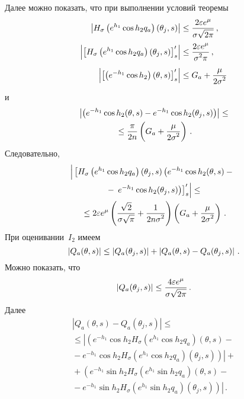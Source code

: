 \begin{multicols}{2}
Далее можно показать, что при выполнении условий теоремы
\begin{align*}
\left|H_\sigma\left ( e^{h_1}\cos{h_2}q_a\right )(\theta_j,s)\right|&
\leq\displaystyle\frac{\displaystyle 2\varepsilon e^{\mu}\mathstrut}{\displaystyle \sigma\sqrt{2\pi}\mathstrut}\,,\\
\left|\left[H_\sigma\left (e^{h_1}\cos{h_2}q_a\right )(\theta_j,s)\right]'_s\right|&
\leq\displaystyle\frac{\displaystyle 2\varepsilon e^{\mu}\mathstrut}{\displaystyle \sigma^2\pi\mathstrut}\,,\\
\left|\left[\left (e^{-h_1}\cos{h_2}\right )(\theta,s)\right]'_s\right|&
\leq G_a+\displaystyle\frac{\displaystyle \mu\mathstrut}{\displaystyle 2\sigma^2\mathstrut}
\end{align*}
и
\begin{multline*}
\left|\left(e^{-h_1}\cos{h_2}(\theta,s)-e^{-h_1}\cos{h_2}(\theta_j,s)\right)\right|\leq\\
{}\leq \displaystyle\frac{\displaystyle \pi\mathstrut}{\displaystyle 2n\mathstrut}\left(G_a+\displaystyle\frac{\displaystyle \mu\mathstrut}{\displaystyle 2\sigma^2\mathstrut}\right)\,.
\end{multline*}
Следовательно,
\begin{multline}
\left|
\vphantom{{}\left.\left.+e^{-h_1}\sin{h_2}H_\sigma(e^{h_1}\sin{h_2}q_a)(\theta,s)\right)'_s\right| \leq{}}
\left[H_\sigma\left ( e^{h_1}\cos{h_2}q_a\right )
(\theta_j,s)\left(e^{-h_1}\cos{h_2}(\theta,s)-{}\right.\right.\right.\\
\left.{}-\left.\left.e^{-h_1}\cos{h_2}(\theta_j,s)\right)\right]'_s\right| \leq{}\\
{}\leq 2\eps e^{\mu}\left(\fr{\sqrt{2}}{\sigma\sqrt{\pi}}+\fr{1}{2n\sigma^2}\right)\left(G_a+\fr{\mu}{2\sigma^2}\right)\,.
\label{e15sh}
\end{multline}
При оценивании~$I_2$ имеем
\begin{equation}
\left|Q_a(\theta,s)\right|\leq\left|Q_a(\theta_j,s)\right|+\left|Q_a(\theta,s)-Q_a(\theta_j,s)\right|\,.
\label{e16sh}
\end{equation}
Можно показать, что
\begin{equation}
\left|Q_a(\theta_j,s)\right|\leq \displaystyle\frac{\displaystyle 4\varepsilon e^{\mu}\mathstrut}{\displaystyle \sigma\sqrt{2\pi}\mathstrut}\,.
\label{e17sh}
\end{equation}
Далее
\begin{multline*}
\left|Q_a(\theta,s)-Q_a(\theta_j,s)\right|\leq{}\\
{}\leq\left|\left(e^{-h_1}\cos{h_2}H_\sigma(e^{h_1}\cos{h_2}q_a)(\theta,s)-{}\right.\right.\\
{}-\left.\left.e^{-h_1}\cos{h_2}H_\sigma(e^{h_1}\cos{h_2}q_a)(\theta_j,s)\right)\right|+{}\\
{}+\left.\left(e^{-h_1}\sin{h_2}H_\sigma(e^{h_1}\sin{h_2}q_a)(\theta,s)-{}\right.\right.\\
{}-\left.\left.e^{-h_1}\sin{h_2}H_\sigma(e^{h_1}\sin{h_2}q_a)(\theta_j,s)\right)\right|\,.

\end{multline*}
\end{multicols}
